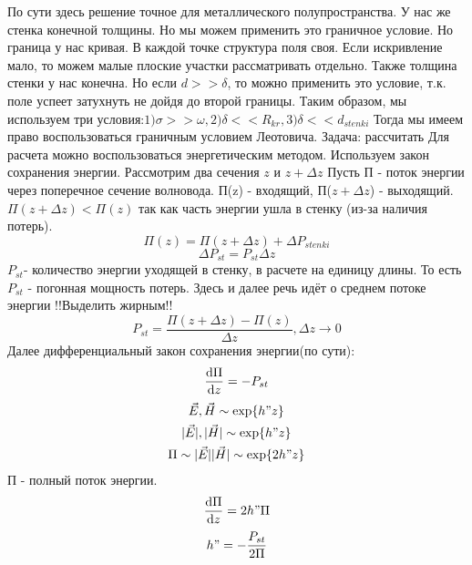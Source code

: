 \begin{enumerate}
\begin{equation}
	\end{equation}
	По сути здесь решение точное для металлического полупространства.
	У нас же стенка конечной толщины. Но мы можем применить это граничное условие.
	Но граница у нас кривая. В каждой точке структура поля своя. Если искривление мало, то можем малые плоские участки рассматривать отдельно.
	Также толщина стенки у нас конечна. Но если $d >> \delta$, то можно применить это условие, т.к. поле успеет затухнуть не дойдя до второй границы.
	Таким образом, мы используем три условия:$1) \sigma >> \omega, 2) \delta << R_{kr}, 3) \delta << d_{stenki}$
	Тогда мы имеем право воспользоваться граничным условием Леотовича.
	Задача: рассчитать 
	Для расчета можно воспользоваться энергетическим методом. Используем закон сохранения энергии.
	Рассмотрим два сечения $z$ и $z+ \Delta{z}$
	Пусть П - поток энергии через поперечное сечение волновода. 
	П(z) - входящий, П($z+ \Delta{z}$)  - выходящий.
	$\Pi(z+ \Delta{z}) < \Pi(z)$ так как часть энергии ушла в стенку (из-за наличия потерь).
	\begin{equation}
		\Pi(z) = \Pi(z+ \Delta{z}) + \Delta{P_{stenki}}
	\end{equation}
	\begin{equation}
		\Delta{P_{st}} = P_{st} \Delta{z}
	\end{equation}
	$P_{st}$- количество энергии уходящей в стенку, в расчете на единицу длины. То есть $P_{st}$ - погонная мощность потерь.
	Здесь и далее речь идёт о среднем потоке энергии !!Выделить жирным!!
	\begin{equation}
		P_{st} = \frac{\Pi(z+ \Delta{z}) - \Pi(z)}{\Delta{z}}, \Delta{z} \rightarrow 0
	\end{equation}
	Далее дифференциальный закон сохранения энергии(по сути):
	\begin{equation}
		\dv{\Pi}{z} = - P_{st}
	\end{equation}
	\begin{gather}
		\vec{E}, \vec{H} \sim \exp{h" z}\\
		|\vec{E}|, |\vec{H}| \sim \exp{h" z}\\
		\Pi \sim |\vec{E}| |\vec{H}| \sim \exp{2 h" z}
	\end{gather}
	П - полный поток энергии.
	\begin{equation}
		\dv{\Pi}{z} = 2 h" \Pi
	\end{equation}
	\begin{equation}
		h" = - \frac{P_{st}}{ 2 \Pi}
	\end{equation}
	\begin{equation}

\end{equation}
\end{enumerate}
